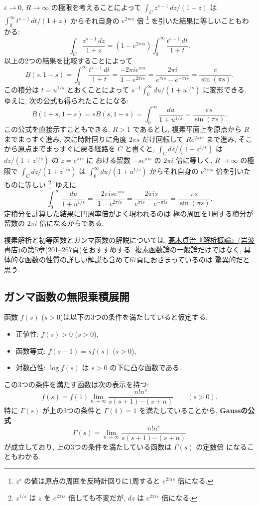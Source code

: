 \documentclass[12pt,twoside]{jarticle}
\newcommand\eps{\varepsilon}
\theoremstyle{jplain}
\theoremstyle{jplain}
\theoremstyle{jplain}
\numberwithin{theorem}{section}
\numberwithin{equation}{section}
\numberwithin{figure}{section}
\numberwithin{table}{section}
\begin{document}
$\eps\to 0$, $R\to\infty$ の極限を考えることによって $\int_C z^{s-1}\,dz/(1+z)$ は
$\int_0^\infty t^{s-1}\,dt/(1+z)$ からそれ自身の $e^{2\pi i s}$ 倍%
\footnote{$z^s$ の値は原点の周囲を反時計回りに1周すると $e^{2\pi i s}$ 倍になる.}
を引いた結果に等しいこともわかる:
\[
\int_C \frac{z^{s-1}\,dz}{1+z} = (1-e^{2\pi i s})\int_0^\infty\frac{t^{s-1}\,dt}{1+t}.
\]
以上の2つの結果を比較することによって
\[
B(s,1-s)
=\int_0^\infty \frac{t^{s-1}\,dt}{1+t}
=\frac{-2\pi i e^{\pi i s}}{1-e^{2\pi i s}}
=\frac{2\pi i}{e^{\pi i s}-e^{-\pi i s}}
=\frac{\pi}{\sin(\pi s)}.
\]
この積分は $t=u^{1/s}$ とおくことによって
$s^{-1}\int_0^\infty du/(1+u^{1/s})$ に変形できる. 
ゆえに, 次の公式も得られたことになる:
\[
B(1+s,1-s)=sB(s,1-s)
=\int_0^\infty \frac{du}{1+u^{1/s}} = \frac{\pi s}{\sin(\pi s)}.
\]
この公式を直接示すこともできる.
$R>1$ であるとし, 
複素平面上を原点から $R$ までまっすぐ進み,
次に時計回りに角度 $2\pi s$ だけ回転して $Re^{2\pi is}$ まで進み, 
そこから原点までまっすぐに戻る経路を $C$ と書くと, 
$\int_C dz/(1+z^{1/s})$ は $dz/(1+z^{1/s})$ の $z=e^{\pi is}$ に
おける留数 $-s e^{\pi is}$ の $2\pi i$ 倍に等しく,
$R\to\infty$ の極限で $\int_C dz/(1+z^{1/s})$ 
は $\int_0^\infty du/(1+u^{1/s})$ からそれ自身の $e^{2\pi is}$ 倍を引いた
ものに等しい%
\footnote{$z^{1/s}$ は $z$ を $e^{2\pi is}$ 倍しても不変だが, 
$dz$ は $e^{2\pi is}$ 倍になる.}. ゆえに
\[
\int_0^\infty \frac{du}{1+u^{1/s}}
=\frac{-2\pi is e^{\pi is}}{1-e^{2\pi is}}
=\frac{2\pi is}{e^{\pi is}-e^{-\pi is}}
=\frac{\pi s}{\sin(\pi s)}.
\]
定積分を計算した結果に円周率倍がよく現われるのは
極の周囲を1周する積分が留数の $2\pi i$ 倍になるからである. 

複素解析と初等函数とガンマ函数の解説については, 
\href{http://www.amazon.co.jp/dp/4000051717}
{高木貞治『解析概論』(岩波書店)}の第5章(201--267頁)をおすすめする.
複素函数論の一般論だけではなく, 
具体的な函数の性質の詳しい解説も含めて67頁におさまっているのは
驚異的だと思う.


\subsection{ガンマ函数の無限乗積展開}
\label{sec:Gamma-prod}

函数 $f(s)$ ($s>0$)は以下の3つの条件を満たしていると仮定する:
\begin{itemize}
\item 正値性: $f(s)>0$ ($s>0$),
\item 函数等式: $f(s+1)=sf(s)$ ($s>0$),
\item 対数凸性: $\log f(s)$ は $s>0$ の下に凸な函数である.
\end{itemize}
この3つの条件を満たす函数は次の表示を持つ:
\[
f(s) = f(1)\lim_{n\to\infty}\frac{n!n^s}{s(s+1)\cdots(s+n)}
\qquad (s>0).
\tag{$*$}
\]
特に $\Gamma(s)$ が上の3つの条件と $\Gamma(1)=1$ を満たしていることから, 
{\bf Gaussの公式}
\[
\Gamma(s)=\lim_{n\to\infty}\frac{n!n^s}{s(s+1)\cdots(s+n)}
\]
が成立しており, 上の3つの条件を満たしている函数は $\Gamma(s)$ の定数倍
になることもわかる.
\end{document}
